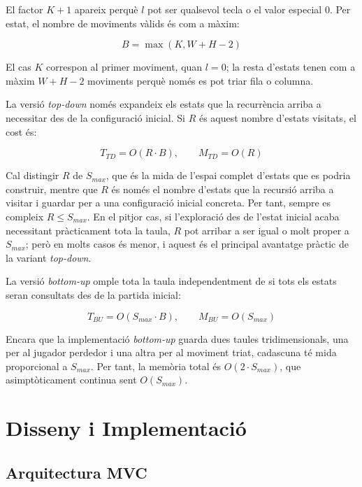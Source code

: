 \documentclass[conference,compsoc]{IEEEtran}
\begin{document}
El factor $K+1$ apareix perquè $l$ pot ser qualsevol tecla o el valor especial
$0$. Per estat, el nombre de moviments vàlids és com a màxim:

\begin{equation}
B=\max(K, W+H-2)
\end{equation}

El cas $K$ correspon al primer moviment, quan $l=0$; la resta d'estats tenen com
a màxim $W+H-2$ moviments perquè només es pot triar fila o columna.

La versió \textit{top-down} només expandeix els estats que la recurrència arriba
a necessitar des de la configuració inicial. Si $R$ és aquest nombre d'estats
visitats, el cost és:

\begin{equation}
T_{TD}=O(R\cdot B), \qquad M_{TD}=O(R)
\end{equation}

Cal distingir $R$ de $S_{max}$, que és la mida de l'espai complet d'estats
que es podria construir, mentre que $R$ és només el nombre d'estats que la
recursió arriba a visitar i guardar per a una configuració inicial concreta. Per
tant, sempre es compleix $R\leq S_{max}$. En el pitjor cas, si l'exploració des
de l'estat inicial acaba necessitant pràcticament tota la taula, $R$ pot arribar
a ser igual o molt proper a $S_{max}$; però en molts casos és menor, i aquest és
el principal avantatge pràctic de la variant \textit{top-down}.

La versió \textit{bottom-up} omple tota la taula independentment de si tots els
estats seran consultats des de la partida inicial:

\begin{equation}
T_{BU}=O(S_{max}\cdot B), \qquad
M_{BU}=O(S_{max})
\end{equation}

Encara que la implementació \textit{bottom-up} guarda dues taules tridimensionals,
una per al jugador perdedor i una altra per al moviment triat, cadascuna té mida
proporcional a $S_{max}$. Per tant, la memòria total és $O(2\cdot S_{max})$, que
asimptòticament continua sent $O(S_{max})$.

\section{Disseny i Implementació}

\subsection{Arquitectura MVC}
\end{document}
